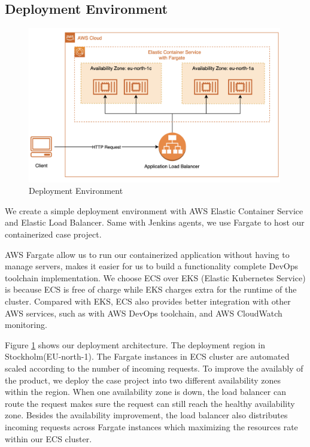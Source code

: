 \subsection{Deployment Environment}
\begin{figure}[h]
 \centering
 \includegraphics[width=0.99\textwidth]{pics/deploy.png}
 \caption{Deployment Environment}
 \label{fig:deploy}
\end{figure}
We create a simple deployment environment with AWS Elastic Container Service and Elastic Load Balancer. Same with Jenkins agents, we use Fargate to host our containerized case project. 
\par
AWS Fargate allow us to run our containerized application without having to manage servers, makes it easier for us to build a functionality complete DevOps toolchain implementation. We choose ECS over EKS (Elastic Kubernetes Service) is because ECS is free of charge while EKS charges extra for the runtime of the cluster. Compared with EKS, ECS also provides better integration with other AWS services, such as with AWS DevOps toolchain, and AWS CloudWatch monitoring.
\par
Figure \ref{fig:deploy}
shows our deployment architecture. The deployment region in Stockholm(EU-north-1). The Fargate instances in ECS cluster are automated scaled according to the number of incoming requests. 
To improve the availably of the product, we deploy the case project into two different availability zones within the region. 
When one availability zone is down, the load balancer can route the request makes sure the request can still reach the healthy availability zone. Besides the availability improvement, the load balancer also distributes incoming requests across Fargate instances which maximizing the resources rate within our ECS cluster.
